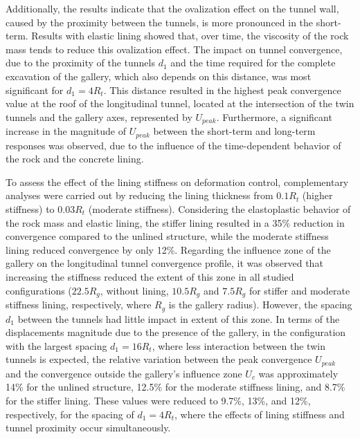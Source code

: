 \documentclass[a4paper,fleqn]{cas-sc}
\begin{document}
Additionally, the results indicate that the ovalization effect on the tunnel wall, caused by the proximity between the tunnels, is more pronounced in the short-term. Results with elastic lining showed that, over time, the viscosity of the rock mass tends to reduce this ovalization effect. The impact on tunnel convergence, due to the proximity of the tunnels $d_1$ and the time required for the complete excavation of the gallery, which also depends on this distance, was most significant for $d_1 = 4R_t$. This distance resulted in the highest peak convergence value at the roof of the longitudinal tunnel, located at the intersection of the twin tunnels and the gallery axes, represented by $U_{peak}$. Furthermore, a significant increase in the magnitude of $U_{peak}$ between the short-term and long-term responses was observed, due to the influence of the time-dependent behavior of the rock and the concrete lining.

To assess the effect of the lining stiffness on deformation control, complementary analyses were carried out by reducing the lining thickness from $0.1R_t$ (higher stiffness) to $0.03R_t$ (moderate stiffness). Considering the elastoplastic behavior of the rock mass and elastic lining, the stiffer lining resulted in a 35\% reduction in convergence compared to the unlined structure, while the moderate stiffness lining reduced convergence by only 12\%. Regarding the influence zone of the gallery on the longitudinal tunnel convergence profile, it was observed that increasing the stiffness reduced the extent of this zone in all studied configurations ($22.5R_g$, without lining, $10.5R_g$ and $7.5R_g$ for stiffer and moderate stiffness lining, respectively, where $R_g$ is the gallery radius). However, the spacing $d_1$ between the tunnels had little impact in extent of this zone. In terms of the displacements magnitude due to the presence of the gallery, in the configuration with the largest spacing $d_1 = 16R_t$, where less interaction between the twin tunnels is expected, the relative variation between the peak convergence $U_{peak}$ and the convergence outside the gallery’s influence zone $U_c$ was approximately 14\% for the unlined structure, 12.5\% for the moderate stiffness lining, and 8.7\% for the stiffer lining. These values were reduced to 9.7\%, 13\%, and 12\%, respectively, for the spacing of $d_1 = 4R_t$, where the effects of lining stiffness and tunnel proximity occur simultaneously.
\end{document}
